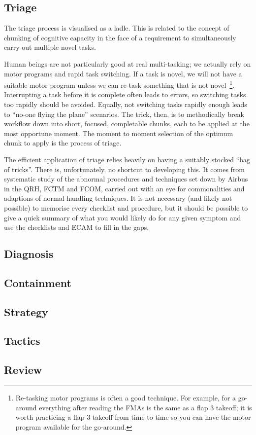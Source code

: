 \documentclass[a5paper,11pt]{article} \usepackage[utf8]{inputenc}
\begin{document}
\subsection{Triage}
The triage process is visualised as a ladle. This is related to the
concept of chunking of cognitive capacity in the face of a requirement
to simultaneously carry out multiple novel tasks.

Human beings are not particularly good at real multi-tasking; we
actually rely on motor programs and rapid task switching. If a task is
novel, we will not have a suitable motor program unless we can re-task
something that is not novel\
\footnote{Re-tasking motor programs is often a good technique. For
  example, for a go-around everything after reading the FMAs is the same
  as a flap 3 takeoff; it is worth practicing a flap 3 takeoff from time
  to time so you can have the motor program available for the
  go-around.}. Interrupting a task before it is complete often leads to
errors, so switching tasks too rapidly should be avoided. Equally, not
switching tasks rapidly enough leads to ``no-one flying the plane''
scenarios. The trick, then, is to methodically break workflow down into
short, focused, completable chunks, each to be applied at the most
opportune moment. The moment to moment selection of the optimum chunk to
apply is the process of triage.

The efficient application of triage relies heavily on having a suitably
stocked ``bag of tricks''. There is, unfortunately, no shortcut to
developing this. It comes from systematic study of the abnormal
procedures and techniques set down by Airbus in the QRH, FCTM and FCOM,
carried out with an eye for commonalities and adaptions of normal
handling techniques. It is not necessary (and likely not possible) to
memorise every checklist and procedure, but it should be possible to
give a quick summary of what you would likely do for any given symptom
and use the checklists and ECAM to fill in the gaps.

\subsection{Diagnosis}

\subsection{Containment}
\subsection{Strategy}
\subsection{Tactics}
\subsection{Review}
\end{document}
